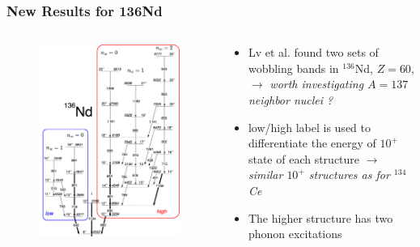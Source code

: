 \documentclass{beamer}
\begin{document}
\begin{frame}
  \frametitle{New Results for 136Nd}
  \begin{columns}
    \begin{column}{0.5\textwidth}
      \begin{figure}
        \centering
        \includegraphics[scale=0.1]{Figs/triaxial-shapes-136Nd.png}
      \end{figure}
    \end{column}
    \begin{column}{0.6\textwidth}
      \begin{itemize}
        \item Lv et al. found two sets of wobbling bands in $^{136}$Nd, $Z=60$,  $\rightarrow$ \emph{worth investigating $A=137$ neighbor nuclei ?}
        \item low/high label is used to differentiate the energy of $10^+$ state of each structure $\rightarrow$ \emph{similar $10^+$ structures as for $^{134}$Ce}
        \item The higher structure has two phonon excitations
      \end{itemize}
    \end{column}
  \end{columns}
\end{frame}
\end{document}
